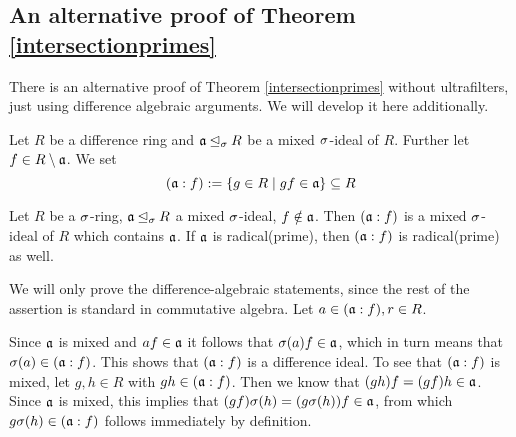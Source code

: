 \subsection{An alternative proof of Theorem \ref{intersectionprimes}}

There is an alternative proof of Theorem \ref{intersectionprimes} without ultrafilters, just using difference algebraic arguments. We will develop it here additionally.

\begin{defn}
Let $R$ be a difference ring and $\mathfrak{a} \unlhd_{\sigma} R$ be a mixed $\sigma$-ideal of $R$. Further let $f \in R \setminus \mathfrak{a}$. We set $$(\mathfrak{a}:f):= \{ g \in R \mid gf \in \mathfrak{a} \} \subseteq R$$
\end{defn}

\begin{lem}\label{a:f}
Let $R$ be a $\sigma$-ring, $\mathfrak{a} \unlhd_{\sigma} R$ a mixed $\sigma$-ideal, $f \notin \mathfrak{a}$. Then $(\mathfrak{a}:f)$ is a mixed $\sigma$-ideal of $R$ which contains $\mathfrak{a}$. If $\mathfrak{a}$ is radical(prime), then $(\mathfrak{a}:f)$ is radical(prime) as well.
\begin{bew}
We will only prove the difference-algebraic statements, since the rest of the assertion is standard in commutative algebra.
Let $a \in (\mathfrak{a}:f), r \in R$. 

Since $\mathfrak{a}$ is mixed and $af \in \mathfrak{a}$ it follows that $\sigma(a)f \in \mathfrak{a}$, which in turn means that $\sigma(a) \in (\mathfrak{a}:f)$. This shows that $(\mathfrak{a}:f)$ is a difference ideal. 
To see that $(\mathfrak{a}:f)$ is mixed, let $g,h \in R$ with $gh \in (\mathfrak{a}:f)$. Then we know that $(gh)f = (gf)h  \in \mathfrak{a}$. Since $\mathfrak{a}$ is mixed, this implies that $(gf)\sigma(h) = (g\sigma(h))f \in \mathfrak{a}$, from which $g\sigma(h) \in (\mathfrak{a}:f)$ follows immediately by definition. \\



\end{bew}
\end{lem}

